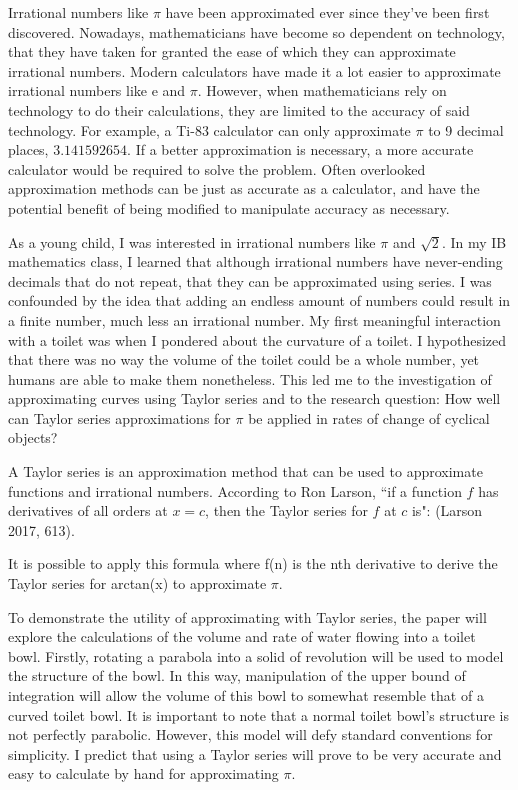 Irrational numbers like \(\pi\) have been approximated ever since they've been first discovered. Nowadays, mathematicians have become so dependent on technology, that they have taken for granted the ease of which they can approximate irrational numbers. Modern calculators have made it a lot easier to approximate irrational numbers like e and \(\pi\). However, when mathematicians rely on technology to do their calculations, they are limited to the accuracy of said technology. For example, a Ti-83 calculator can only approximate \(\pi\) to 9 decimal places, \(3.141592654\). If a better approximation is necessary, a more accurate calculator would be required to solve the problem. Often overlooked approximation methods can be just as accurate as a calculator, and have the potential benefit of being modified to manipulate accuracy as necessary.

As a young child, I was interested in irrational numbers like \(\pi\) and \(\sqrt{2}\). In my IB mathematics class, I learned that although irrational numbers have never-ending decimals that do not repeat, that they can be approximated using series. I was confounded by the idea that adding an endless amount of numbers could result in a finite number, much less an irrational number. My first meaningful interaction with a toilet was when I pondered about the curvature of a toilet. I hypothesized that there was no way the volume of the toilet could be a whole number, yet humans are able to make them nonetheless. This led me to the investigation of approximating curves using Taylor series and to the research question: How well can Taylor series approximations for \(\pi\) be applied in rates of change of cyclical objects?

A Taylor series is an approximation method that can be used to approximate functions and irrational numbers. According to Ron Larson, ``if a function \(f\) has derivatives of all orders at \(x = c\), then the Taylor series for \(f\) at \(c\) is": (Larson 2017, 613).

It is possible to apply this formula where f(n) is the nth derivative to derive the Taylor series for arctan(x) to approximate \(\pi\).

To demonstrate the utility of approximating with Taylor series, the paper will explore the calculations of the volume and rate of water flowing into a toilet bowl. Firstly, rotating a parabola into a solid of revolution will be used to model the structure of the bowl. In this way, manipulation of the upper bound of integration will allow the volume of this bowl to somewhat resemble that of a curved toilet bowl. It is important to note that a normal toilet bowl's structure is not perfectly parabolic. However, this model will defy standard conventions for simplicity. I predict that using a Taylor series will prove to be very accurate and easy to calculate by hand for approximating \(\pi\). 

